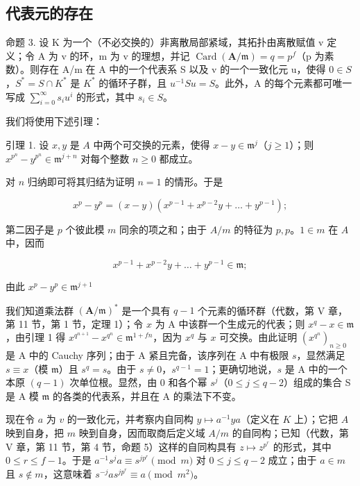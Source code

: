 \subsection{代表元的存在}

命题 3. 设 K 为一个（不必交换的）非离散局部紧域，其拓扑由离散赋值 v 定义；令 A 为 v 的环，m 为 v 的理想，并记 \(\operatorname{Card}(\mathbf{A}/\mathfrak{m}) = q = p^{f}\)（p 为素数）。则存在 A/m 在 A 中的一个代表系 S 以及 v 的一个一致化元 u，使得 \(0 \in S\)，\(S^{*} = S \cap K^{*}\) 是 \(K^{*}\) 的循环子群，且 \(u^{-1} Su = S\)。此外，A 的每个元素都可唯一写成 \(\sum_{i=0}^{\infty} s_{i} u^{i}\) 的形式，其中 \(s_{i} \in S\)。

我们将使用下述引理：

引理 1. 设 \(x, y\) 是 \(A\) 中两个可交换的元素，使得 \(x - y \in \mathfrak{m}^j\)（\(j \geqslant 1\)）；则 \(x^{p^n} - y^{p^n} \in \mathfrak{m}^{j + n}\) 对每个整数 \(n \geqslant 0\) 都成立。

对 \(n\) 归纳即可将其归结为证明 \(n = 1\) 的情形。于是

\[
x ^ {p} - y ^ {p} = (x - y) \left(x ^ {p - 1} + x ^ {p - 2} y + \dots + y ^ {p - 1}\right);
\]

第二因子是 \(p\) 个彼此模 \(m\) 同余的项之和；由于 \(A / m\) 的特征为 \(p, p\)。\(1 \in m\) 在 \(A\) 中，因而

\[
x ^ {p - 1} + x ^ {p - 2} y + \dots + y ^ {p - 1} \in \mathfrak {m};
\]

由此 \(x^{p} - y^{p}\in \mathfrak{m}^{j + 1}\)

我们知道乘法群 \((\mathbf{A} / \mathfrak{m})^*\) 是一个具有 \(q - 1\) 个元素的循环群（代数，第 V 章，第 11 节，第 1 节，定理 1）；令 \(x\) 为 A 中该群一个生成元的代表；则 \(x^{q} - x \in \mathfrak{m}\)，由引理 1 得 \(x^{q^{n + 1}} - x^{q^n} \in \mathfrak{m}^{1 + fn}\)，因为 \(x^{q}\) 与 \(x\) 可交换。由此证明 \((x^{q^n})_{n \geqslant 0}\) 是 A 中的 Cauchy 序列；由于 A 紧且完备，该序列在 A 中有极限 \(s\)，显然满足 \(s \equiv x\)（模 \(\mathfrak{m}\)）且 \(s^q = s\)。由于 \(s \neq 0\)，\(s^{q - 1} = 1\)；更确切地说，\(s\) 是 A 中的一个本原 \((q - 1)\) 次单位根。显然，由 0 和各个幂 \(s^j\)（\(0 \leqslant j \leqslant q - 2\)）组成的集合 S 是 A 模 \(\mathfrak{m}\) 的各类的代表系，并且在 A 的乘法下不变。

现在令 \(a\) 为 \(v\) 的一致化元，并考察内自同构 \(y \mapsto a^{-1}ya\)（定义在 \(K\) 上）；它把 \(A\) 映到自身，把 \(m\) 映到自身，因而取商后定义域 \(A/m\) 的自同构；已知（代数，第 V 章，第 11 节，第 4 节，命题 5）这样的自同构具有 \(z \mapsto z^{p^r}\) 的形式，其中 \(0 \leqslant r \leqslant f - 1\)。于是 \(a^{-1}s^j a \equiv s^{jp^r} \pmod{m}\) 对 \(0 \leqslant j \leqslant q - 2\) 成立；由于 \(a \in m\) 且 \(s \notin m\)，这意味着 \(s^{-j}as^{jp^r} \equiv a \pmod{m^2}\)。

